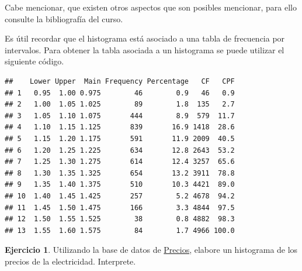 \documentclass[
  11pt,
]{book}
\newenvironment{Shaded}{\begin{snugshade}}{\end{snugshade}}
\newcommand{\AttributeTok}[1]{\textcolor[rgb]{0.13,0.29,0.53}{#1}}
\newcommand{\CommentTok}[1]{\textcolor[rgb]{0.56,0.35,0.01}{\textit{#1}}}
\newcommand{\DecValTok}[1]{\textcolor[rgb]{0.00,0.00,0.81}{#1}}
\newcommand{\FunctionTok}[1]{\textcolor[rgb]{0.13,0.29,0.53}{\textbf{#1}}}
\newcommand{\NormalTok}[1]{#1}
\newcommand{\OtherTok}[1]{\textcolor[rgb]{0.56,0.35,0.01}{#1}}
\newcommand{\SpecialCharTok}[1]{\textcolor[rgb]{0.81,0.36,0.00}{\textbf{#1}}}
\theoremstyle{definition}
\theoremstyle{definition}
\theoremstyle{definition}
\newtheorem{exercise}{Ejercicio}[chapter]
\theoremstyle{definition}
\theoremstyle{remark}
\begin{document}
Cabe mencionar, que existen otros aspectos que son posibles mencionar, para ello consulte la bibliografía del curso.

Es útil recordar que el histograma está asociado a una tabla de frecuencia por intervalos. Para obtener la tabla asociada a un histograma se puede utilizar el siguiente código.

\begin{Shaded}
\end{Shaded}

\begin{verbatim}
##    Lower Upper  Main Frequency Percentage   CF   CPF
## 1   0.95  1.00 0.975        46        0.9   46   0.9
## 2   1.00  1.05 1.025        89        1.8  135   2.7
## 3   1.05  1.10 1.075       444        8.9  579  11.7
## 4   1.10  1.15 1.125       839       16.9 1418  28.6
## 5   1.15  1.20 1.175       591       11.9 2009  40.5
## 6   1.20  1.25 1.225       634       12.8 2643  53.2
## 7   1.25  1.30 1.275       614       12.4 3257  65.6
## 8   1.30  1.35 1.325       654       13.2 3911  78.8
## 9   1.35  1.40 1.375       510       10.3 4421  89.0
## 10  1.40  1.45 1.425       257        5.2 4678  94.2
## 11  1.45  1.50 1.475       166        3.3 4844  97.5
## 12  1.50  1.55 1.525        38        0.8 4882  98.3
## 13  1.55  1.60 1.575        84        1.7 4966 100.0
\end{verbatim}

\begin{exercise}
Utilizando la base de datos de \hyperref[PreciosElectricidad]{Precios}, elabore un histograma de los precios de la electricidad. Interprete.
\end{exercise}
\end{document}
